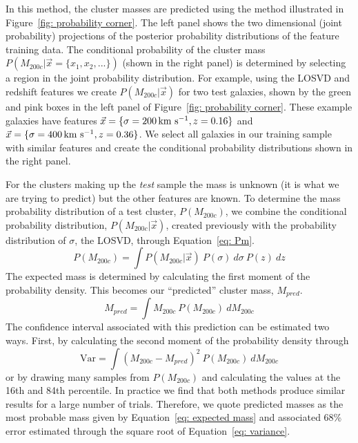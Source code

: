 In this method, the cluster masses are predicted using the method illustrated in Figure~\ref{fig: probability corner}. The left panel shows the two dimensional (joint probability) projections of the posterior probability distributions of the feature training data. The conditional probability of the cluster mass $P(M_{200c}|\vec{x}= \{ x_1,x_2,...\})$ (shown in the right panel) is determined by selecting a region in the joint probability distribution. For example, using the LOSVD and redshift features we create $P(M_{200c}|\vec{x})$ for two test galaxies, shown by the green and pink boxes in the left panel of Figure~\ref{fig: probability corner}. These example galaxies have features $\vec{x} = \{\sigma=200\, \hbox{km~s$^{-1}$},z=0.16\}$ and $\vec{x} = \{\sigma=400\, \hbox{km~s$^{-1}$},z=0.36\}$. We select all galaxies in our training sample with similar features and create the conditional probability distributions shown in the right panel.

For the clusters making up the \emph{test} sample the mass is unknown (it is what we are trying to predict) but the other features are known. To determine the mass probability distribution of a test cluster, $P(M_{200c})$, we combine the conditional probability distribution, $P(M_{200c}|\vec{x})$, created previously with the probability distribution of $\sigma$, the LOSVD, through Equation~\ref{eq: Pm}.
\begin{equation}\label{eq: Pm}
	P(M_{200c}) = \int P(M_{200c}|\vec{x})\ P(\sigma)\ d\sigma\ P(z)\ dz
\end{equation}
The expected mass is determined by calculating the first moment of the probability density. This becomes our ``predicted'' cluster mass, $M_{pred}$.
\begin{equation}\label{eq: expected mass}
	M_{pred}= \int M_{200c}\ P(M_{200c})\ dM_{200c}
\end{equation}
The confidence interval associated with this prediction can be estimated two ways. First, by calculating the second moment of the probability density through
\begin{equation}\label{eq: variance}
	\mathrm{Var} = \int (M_{200c} - M_{pred})^2\ P(M_{200c})\ dM_{200c}
\end{equation}
or by drawing many samples from $P(M_{200c})$ and calculating the values at the 16th and 84th percentile. In practice we find that both methods produce similar results for a large number of trials. Therefore, we quote predicted masses as the most probable mass given by Equation~\ref{eq: expected mass} and associated 68\% error estimated through the square root of Equation~\ref{eq: variance}.

